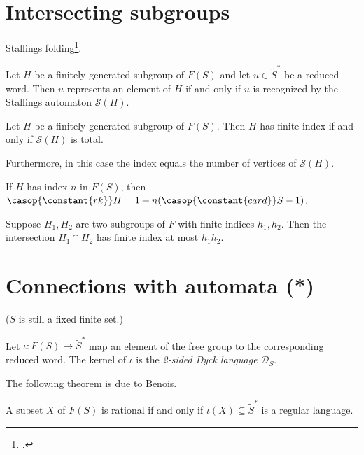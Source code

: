 \section{Intersecting subgroups}
\label{sec:intersecting-subgroups}

Stallings folding\footcite{Stallings1991}.

\begin{theorem}
  Let $H$ be a finitely generated subgroup of $F(S)$ and let $u\in\tilde S^*$
  be a reduced word. Then $u$ represents an element of $H$ if and only if
  $u$ is recognized by the Stallings automaton $\mathcal{S}(H)$.
\end{theorem}
\begin{theorem}
  Let $H$ be a finitely generated subgroup of $F(S)$.
  Then $H$ has finite index if and only if $\mathcal{S}(H)$ is total.

  Furthermore, in this case the index equals the number of vertices of
  $\mathcal{S}(H)$.
\end{theorem}
\begin{corollary}
  If $H$ has index $n$ in $F(S)$, then $\casop{\constant{rk}} H = 1 + n(\casop{\constant{card}} S-1)$.
\end{corollary}

\begin{theorem}\label{thm:howson-neumann}
  Suppose $H_1,H_2$ are two subgroups of $F$ with finite indices $h_1,h_2$.
  Then the intersection $H_1\cap H_2$ has finite index at most $h_1h_2$.
\end{theorem}

\section{Connections with automata (*)}

($S$ is still a fixed finite set.)

Let $\iota : F(S) \to \tilde S^*$ map an element of the free group to the corresponding reduced word.
The kernel of $\iota$ is the \emph{2-sided Dyck language} $\mathcal D_S$.

The following theorem is due to Benois.
\begin{theorem}
  A subset $X$ of $F(S)$ is rational if and only if
  $\iota(X)\subseteq \tilde S^*$ is a regular language.
\end{theorem}

